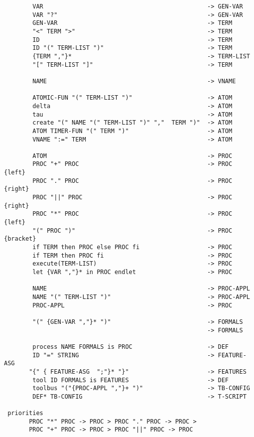 \begin{verbatim}
        VAR                                              -> GEN-VAR
        VAR "?"                                          -> GEN-VAR
        GEN-VAR                                          -> TERM
        "<" TERM ">"                                     -> TERM
        ID                                               -> TERM
        ID "(" TERM-LIST ")"                             -> TERM
        {TERM ","}*                                      -> TERM-LIST
        "[" TERM-LIST "]"                                -> TERM

        NAME                                             -> VNAME

        ATOMIC-FUN "(" TERM-LIST ")"                     -> ATOM
        delta                                            -> ATOM
        tau                                              -> ATOM
        create "(" NAME "(" TERM-LIST ")" ","  TERM ")"  -> ATOM
        ATOM TIMER-FUN "(" TERM ")"                      -> ATOM
        VNAME ":=" TERM                                  -> ATOM

        ATOM                                             -> PROC
        PROC "+" PROC                                    -> PROC  {left}
        PROC "." PROC                                    -> PROC  {right}
        PROC "||" PROC                                   -> PROC  {right}
        PROC "*" PROC                                    -> PROC  {left}
        "(" PROC ")"                                     -> PROC  {bracket}
        if TERM then PROC else PROC fi                   -> PROC
        if TERM then PROC fi                             -> PROC
        execute(TERM-LIST)                               -> PROC
        let {VAR ","}* in PROC endlet                    -> PROC

        NAME                                             -> PROC-APPL
        NAME "(" TERM-LIST ")"                           -> PROC-APPL
        PROC-APPL                                        -> PROC

        "(" {GEN-VAR ","}* ")"                           -> FORMALS
                                                         -> FORMALS

        process NAME FORMALS is PROC                     -> DEF
        ID "=" STRING                                    -> FEATURE-ASG
       "{" { FEATURE-ASG  ";"}* "}"                      -> FEATURES
        tool ID FORMALS is FEATURES                      -> DEF
        toolbus "("{PROC-APPL ","}+ ")"                  -> TB-CONFIG
        DEF* TB-CONFIG                                   -> T-SCRIPT

 priorities
       PROC "*" PROC -> PROC > PROC "." PROC -> PROC >
       PROC "+" PROC -> PROC > PROC "||" PROC -> PROC

\end{verbatim}
\normalsize
